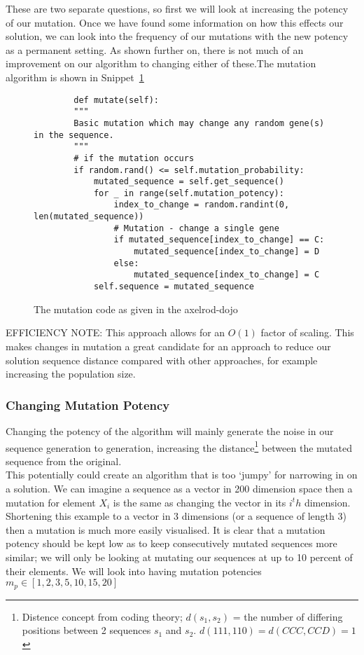 These are two separate questions, so first we will look at increasing the potency of our mutation. 
Once we have found some information on how this effects our solution, we can look into the frequency of our mutations with the new potency as a permanent setting.
As shown further on, there is not much of an improvement on our algorithm to changing either of these.The mutation algorithm is shown in Snippet~\ref{code:mutate}\\
\begin{figure}
    \begin{verbatim}
        def mutate(self):
        """
        Basic mutation which may change any random gene(s) in the sequence.
        """
        # if the mutation occurs
        if random.rand() <= self.mutation_probability:
            mutated_sequence = self.get_sequence()
            for _ in range(self.mutation_potency):
                index_to_change = random.randint(0, len(mutated_sequence))
                # Mutation - change a single gene
                if mutated_sequence[index_to_change] == C:
                    mutated_sequence[index_to_change] = D
                else:
                    mutated_sequence[index_to_change] = C
            self.sequence = mutated_sequence
    \end{verbatim}
    \caption{The mutation code as given in the axelrod-dojo}\label{code:mutate}    
\end{figure}

EFFICIENCY NOTE\@: This approach allows for an \(O(1)\) factor of scaling.
This makes changes in mutation a great candidate for an approach to reduce our solution sequence distance compared with other approaches, for example increasing the population size.\\

\subsubsection{Changing Mutation Potency}
Changing the potency of the algorithm will mainly generate the noise in our sequence generation to generation, increasing the distance\footnote{Distence concept from coding theory; \(d(s_1,s_2)\) =  the number of differing positions between 2 sequences \(s_1\) and \(s_2\). \(d(111,110) = d(CCC,CCD) = 1 \)} between the mutated sequence from the original.\\ 

This potentially could create an algorithm that is too `jumpy' for narrowing in on a solution.
We can imagine a sequence as a vector in 200 dimension space then a mutation for element \(X_i\) is the same as changing the vector in its \(i^th\) dimension.
Shortening this example to a vector in 3 dimensions (or a sequence of length 3) then a mutation is much more easily visualised.
It is clear that a mutation potency should be kept low as to keep consecutively mutated sequences more similar; we will only be looking at mutating our sequences at up to 10 percent of their elements.
We will look into having mutation potencies \(m_p \in [1,2,3,5,10,15,20]\)\\

